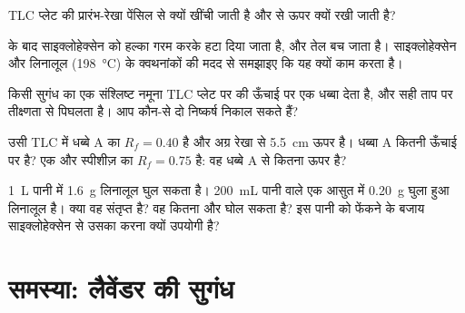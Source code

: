 \begin{exercise}[$\star\star$]\label{exo:g10:chemical-species:11}
TLC प्लेट की प्रारंभ-रेखा पेंसिल से क्यों खींची जाती है और  से ऊपर
क्यों रखी जाती है?
\end{exercise}

\begin{exercise}[$\star\star\star$]\label{exo:g10:chemical-species:12}
 के बाद साइक्लोहेक्सेन को हल्का गरम करके हटा दिया जाता है, और तेल बच
जाता है। साइक्लोहेक्सेन और लिनालूल (\qty{198}{\celsius}) के क्वथनांकों की मदद से
समझाइए कि यह क्यों काम करता है।
\end{exercise}

\begin{exercise}[$\star\star\star$]\label{exo:g10:chemical-species:13}
किसी सुगंध का एक संश्लिष्ट नमूना TLC प्लेट पर  की ऊँचाई पर
एक धब्बा देता है, और सही ताप पर तीक्ष्णता से पिघलता है। आप कौन-से
दो निष्कर्ष निकाल सकते हैं?
\end{exercise}

\begin{exercise}[$\star\star\star$]\label{exo:g10:chemical-species:14}
उसी TLC में धब्बे A का $R_f = 0.40$ है और अग्र रेखा से \qty{5.5}{cm}
ऊपर है। धब्बा A कितनी ऊँचाई पर है? एक और स्पीशीज़ का
$R_f = 0.75$ है: वह धब्बे A से कितना ऊपर है?
\end{exercise}

\begin{exercise}[$\star\star\star$]\label{exo:g10:chemical-species:15}
\qty{1}{L} पानी में \qty{1.6}{g} लिनालूल घुल सकता है। \qty{200}{mL} पानी
वाले एक आसुत में \qty{0.20}{g} घुला हुआ लिनालूल है। क्या वह
संतृप्त है? वह कितना और घोल सकता है? इस पानी को फेंकने के बजाय साइक्लोहेक्सेन
से उसका  करना क्यों उपयोगी है?
\end{exercise}

\clearpage %
\section{समस्या: लैवेंडर की सुगंध}


